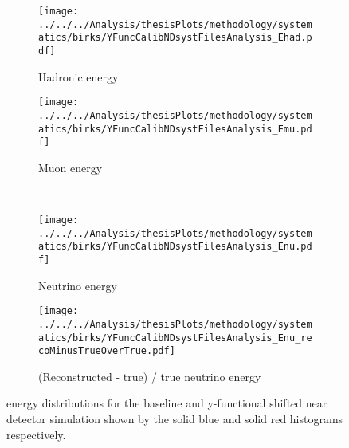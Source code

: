 \begin{figure}%
  \begin{subfigure}{.5\textwidth}
    \centering
    \texttt{[image: ../../../Analysis/thesisPlots/methodology/systematics/birks/YFuncCalibNDsystFilesAnalysis\_Ehad.pdf]}
    \caption{Hadronic energy}
    \label{fig:systsNDY_had}
  \end{subfigure}%
  \begin{subfigure}{.5\textwidth}
    \centering
    \texttt{[image: ../../../Analysis/thesisPlots/methodology/systematics/birks/YFuncCalibNDsystFilesAnalysis\_Emu.pdf]}
    \caption{Muon energy }
    \label{fig:systsNDY_mu}
  \end{subfigure}\\
  \begin{subfigure}{.5\textwidth}
    \centering
    \texttt{[image: ../../../Analysis/thesisPlots/methodology/systematics/birks/YFuncCalibNDsystFilesAnalysis\_Enu.pdf]}
    \caption{Neutrino energy}
    \label{fig:systsNDY_nu}
  \end{subfigure}%
  \begin{subfigure}{.5\textwidth}
    \centering
    \texttt{[image: ../../../Analysis/thesisPlots/methodology/systematics/birks/YFuncCalibNDsystFilesAnalysis\_Enu\_recoMinusTrueOverTrue.pdf]}
    \caption{(Reconstructed  - true) / true neutrino energy }
    \label{fig:systsNDY_rmtot}
  \end{subfigure}
  \caption{energy distributions for the baseline and
    y-functional shifted near detector simulation shown
    by the solid blue and solid red histograms
    respectively. }
  \label{fig:systsNDY}
\end{figure}



